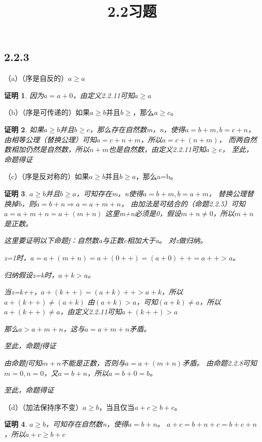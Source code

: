 \documentclass{article}
\theoremstyle{mystyle}
\theoremstyle{zproofstyle}
\newtheorem*{zproof}{证明}
\begin{document}
\title{2.2习题}
\maketitle
\subsection*{2.2.3}

（a）（序是自反的）$a \geq a$

\begin{zproof}
  因为$a = a + 0$，由定义2.2.11可知$a \geq a$
\end{zproof}

（b）（序是可传递的）如果$a \geq b$并且$b \geq $，那么$a \geq c$。

\begin{zproof}
  如果$a \geq b$并且$b \geq c$，那么存在自然数m，n，使得$a = b + m, b = c + n$，
  由相等公理（替换公理）可知$a= c + n + m$，所以$a = c + (n+m)$，
  而两自然数相加仍然是自然数，所以$n+m$也是自然数，由定义2.2.11可知$a \geq c$，
  至此，命题得证
\end{zproof}

（c）（序是反对称的）如果$a \geq b$并且$b \geq a$，那么a=b。

\begin{zproof}
  $a \geq b$并且$b \geq a$，可知存在m，n使得$a=b+m, b=a+m$，
  替换公理替换掉b，则$a=b+n \Rightarrow a=a+m+n$，
  由加法是可结合的（命题2.2.5）可知$a=a+m+n=a+(m+n)$
  这里m+n必须是0，假设$m+n \neq 0$，所以$m+n$是正数。

  这里要证明以下命题f：自然数a与正数c相加大于a。
  对z做归纳。

  z=1时，$a=a+(m+n)=a+(0++)=(a+0)++=a++>a$。

  归纳假设z=k时，$a+k > a$。

  当z=k++，$a+(k++)=(a+k)++>a+k$，所以$a+(k++) \neq (a+k)$
  由$(a+k)>a$，可知$(a+k) \neq a$，所以$a+(k++) \neq a$，由定义2.2.11可知$a+(k++)>a$

  那么$a >  a+m+n$，这与$a=a+m+n $矛盾。

  至此，命题f得证

  由命题f可知$m+n$不能是正数，否则与$a=a+(m+n)$矛盾。
  由命题2.2.8可知$m=0,n=0$，又$a=b+n$，所以$a=b+0=b$。

  至此，命题得证
\end{zproof}

（d）（加法保持序不变）$a \geq b$，当且仅当$a+c \geq b+c$。

\begin{zproof}
  $a \geq b$，可知存在自然数n，使得$a=b+n$。
  $a+c=b+n+c=b+c+n$，所以$a+c \geq b+c$
\end{zproof}
\end{document}
